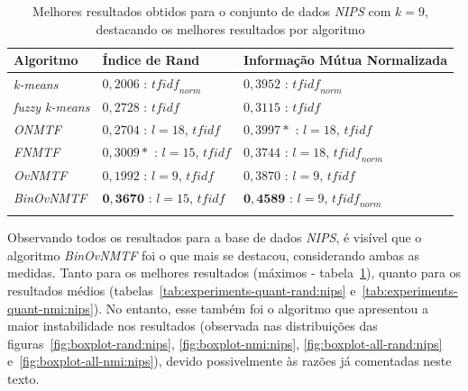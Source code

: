 \documentclass[
    12pt,                %
    oneside,            %
    a4paper,            %
    english,            %
    brazil                %
    ]{abntex2ppgsi}
\begin{document}
\begin{table}[H]
\centering
    \caption{Melhores resultados obtidos para o conjunto de dados \textit{NIPS} com $k = 9$, destacando os melhores resultados por algoritmo}
    \begin{tabular}{lll}
        \hline
        \textbf{Algoritmo}              & \textbf{Índice de Rand} & \textbf{Informação Mútua Normalizada} \\
        \hline
        \textit{k-means}       & $0,2006$ : $\textit{tfidf}_{norm}$           & $0,3952$ : $\textit{tfidf}_{norm}$ \\
        \textit{fuzzy k-means} & $0,2728$ : $\textit{tfidf}$                  & $0,3115$ : $\textit{tfidf}$ \\
        \textit{ONMTF}         & $0,2704$ : $l=18$, $\textit{tfidf}$          & $0,3997*$ : $l=18$, $\textit{tfidf}$\\
        \textit{FNMTF}         & $0,3009*$ : $l=15$, $\textit{tfidf}$         & $0,3744$ : $l=18$, $\textit{tfidf}_{norm}$ \\
        \textit{OvNMTF}        & $0,1992$ : $l=9$, $\textit{tfidf}$           & $0,3870$ : $l=9$, $\textit{tfidf}$\\
        \textit{BinOvNMTF}     & $\mathbf{0,3670}$ : $l=15$, $\textit{tfidf}$ & $\mathbf{0,4589}$ : $l=9$, $\textit{tfidf}_{norm}$ \\
        \hline \\
    \end{tabular}
    \label{tab:experiments-quant-best-nmi:nips}
\end{table}

Observando todos os resultados para a base de dados \textit{NIPS}, é visível que o algoritmo \textit{BinOvNMTF} foi o que mais se destacou, considerando ambas as medidas.
Tanto para os melhores resultados (máximos - tabela~\ref{tab:experiments-quant-best-nmi:nips}), quanto para os resultados médios (tabelas~\ref{tab:experiments-quant-rand:nips} e~\ref{tab:experiments-quant-nmi:nips}).
No entanto, esse também foi o algoritmo que apresentou a maior instabilidade nos resultados (observada nas distribuições das figuras~\ref{fig:boxplot-rand:nips}, \ref{fig:boxplot-nmi:nips}, \ref{fig:boxplot-all-rand:nips} e~\ref{fig:boxplot-all-nmi:nips}), devido possivelmente às razões já comentadas neste texto. %
\end{document}
